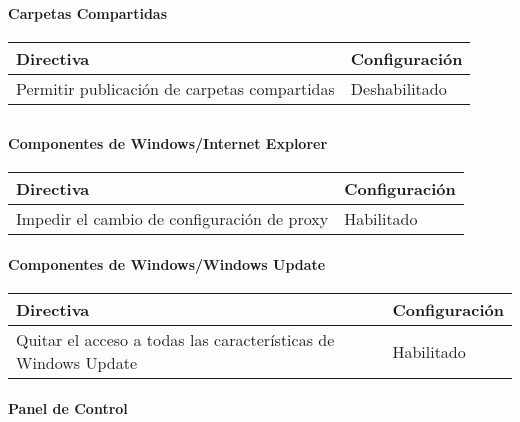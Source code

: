 \documentclass[
]{article}
\begin{document}
\hypertarget{carpetas-compartidas}{%
\paragraph{Carpetas Compartidas}\label{carpetas-compartidas}}

\begin{longtable}[]{@{}ll@{}}
\toprule
\textbf{Directiva} & \textbf{Configuración}\tabularnewline
\midrule
\endhead
Permitir publicación de carpetas compartidas &
Deshabilitado\tabularnewline
\bottomrule
\end{longtable}

\hypertarget{section-16}{%
\subsection{}\label{section-16}}

\hypertarget{componentes-de-windowsinternet-explorer}{%
\paragraph{Componentes de Windows/Internet
Explorer}\label{componentes-de-windowsinternet-explorer}}

\begin{longtable}[]{@{}ll@{}}
\toprule
\textbf{Directiva} & \textbf{Configuración}\tabularnewline
\midrule
\endhead
Impedir el cambio de configuración de proxy & Habilitado\tabularnewline
\bottomrule
\end{longtable}

\hypertarget{componentes-de-windowswindows-update-1}{%
\paragraph{Componentes de Windows/Windows
Update}\label{componentes-de-windowswindows-update-1}}

\begin{longtable}[]{@{}ll@{}}
\toprule
\textbf{Directiva} & \textbf{Configuración}\tabularnewline
\midrule
\endhead
Quitar el acceso a todas las características de Windows Update &
Habilitado\tabularnewline
\bottomrule
\end{longtable}

\hypertarget{section-17}{%
\paragraph{}\label{section-17}}

\hypertarget{panel-de-control}{%
\paragraph{Panel de Control}\label{panel-de-control}}
\end{document}
